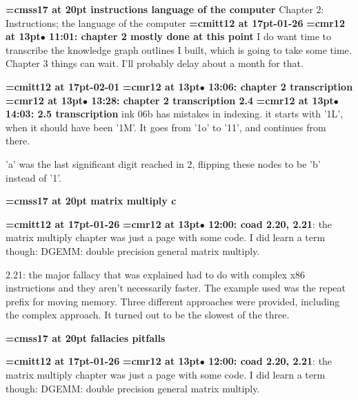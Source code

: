 {\medskip\noindent\bf\font\titlefont=cmss17 at 20pt instructions language of the computer}\medskip
Chapter 2: Instructions; the language of the computer
{\medskip\noindent\bf\font\titlefont=cmitt12 at 17pt-01-26}\medskip
{\smallskip\noindent\bf\font\titlefont=cmr12 at 13pt\titlefont $\bullet$ 11:01: chapter 2 mostly done at this point}\smallskip
I do want time to transcribe the knowledge graph outlines I built, which is going to take some time. Chapter 3 things can wait. I'll probably delay about a month for that.
\par

{\medskip\noindent\bf\font\titlefont=cmitt12 at 17pt-02-01}\medskip
{\smallskip\noindent\bf\font\titlefont=cmr12 at 13pt\titlefont $\bullet$ 13:06: chapter 2 transcription}\smallskip
{\smallskip\noindent\bf\font\titlefont=cmr12 at 13pt\titlefont $\bullet$ 13:28: chapter 2 transcription 2.4}\smallskip
{\smallskip\noindent\bf\font\titlefont=cmr12 at 13pt\titlefont $\bullet$ 14:03: 2.5 transcription}\smallskip
ink 06b has mistakes in indexing. it starts with '1L', when it should have been '1M'. It goes from '1o' to '11', and continues from there.
\par

'a' was the last significant digit reached in 2, flipping these nodes to be 'b' instead of '1'.
\par

{\medskip\noindent\bf\font\titlefont=cmss17 at 20pt matrix multiply c}\medskip

{\medskip\noindent\bf\font\titlefont=cmitt12 at 17pt-01-26}\medskip
{\smallskip\noindent\bf\font\titlefont=cmr12 at 13pt\titlefont $\bullet$ 12:00: coad 2.20, 2.21}: the matrix multiply chapter was just a page with some code. I did learn a term though: DGEMM: double precision general matrix multiply.
\par

2.21: the major fallacy that was explained had to do with complex x86 instructions and they aren't necessarily faster. The example used was the repeat prefix for moving memory. Three different approaches were provided, including the complex approach. It turned out to be the slowest of the three.
\par

{\medskip\noindent\bf\font\titlefont=cmss17 at 20pt fallacies pitfalls}\medskip

{\medskip\noindent\bf\font\titlefont=cmitt12 at 17pt-01-26}\medskip
{\smallskip\noindent\bf\font\titlefont=cmr12 at 13pt\titlefont $\bullet$ 12:00: coad 2.20, 2.21}: the matrix multiply chapter was just a page with some code. I did learn a term though: DGEMM: double precision general matrix multiply.
\par

